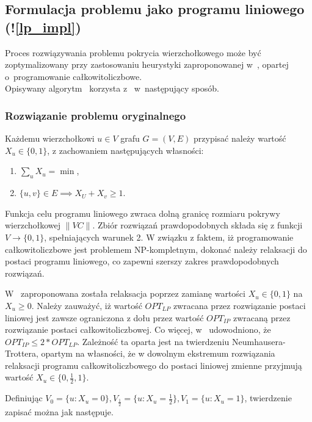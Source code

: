 \subsection{Formulacja problemu jako programu liniowego (!\ref{lp_impl})}\label{section_kernelization_lp_formulation}

Proces rozwiązywania problemu pokrycia wierzchołkowego może być zoptymalizowany
przy zastosowaniu heurystyki zaproponowanej w~\cite{hochbaum82}, opartej 
o~programowanie całkowitoliczbowe. \\
Opisywany algorytm~\cite[rozdz.~4.2.2]{abukhzam03} korzysta z~\cite{hochbaum82} 
w~następujący sposób.

\subsubsection{Rozwiązanie problemu oryginalnego}\label{ss_lp_original}

Każdemu wierzchołkowi $u \in V$ grafu $G=(V,E)$ przypisać należy wartość $X_u
\in \{0, 1\}$, z zachowaniem następujących własności:
\begin{enumerate}
  \item $\sum_{u}X_u = \min$,
  \item $\{u,v\} \in E \implies X_U + X_v \geq 1$.
\end{enumerate}

Funkcja celu programu liniowego zwraca dolną granicę rozmiaru pokrywy 
wierzchołkowej $\|VC\|$.
Zbiór rozwiązań prawdopodobnych składa się z funkcji $V \to \{0, 1\}$,
spełniających warunek 2.
W związku z faktem, iż programowanie całkowitoliczbowe jest problemem
NP-kompletnym, dokonać należy relaksacji do postaci programu liniowego, co
zapewni szerszy zakres prawdopodobnych rozwiązań.

W~\cite{khuller02} zaproponowana została relaksacja poprzez zamianę wartości 
$X_u \in \{0,1\}$ na $X_u \geq 0$.
Należy zauważyć, iż wartość $OPT_{LP}$ zwracana przez rozwiązanie postaci 
liniowej jest zawsze ograniczona z dołu przez wartość $OPT_{IP}$ zwracaną przez 
rozwiązanie postaci całkowitoliczbowej.
Co więcej, w~\cite{khuller02} udowodniono, że $OPT_{IP} \leq 2*OPT_{LP}$.
Zależność ta oparta jest na twierdzeniu Neumhausera-Trottera, 
opartym na własności, że w dowolnym ekstremum rozwiązania relaksacji programu
całkowitoliczbowego do postaci liniowej zmienne przyjmują wartość 
$X_u \in \{0, \frac{1}{2}, 1\}$.

Definiując $V_0 = \{u : X_u=0\}, V_{\frac{1}{2}}=\{u: X_u=\frac{1}{2}\},
V_1=\{u: X_u=1\}$, twierdzenie zapisać można jak następuje.

